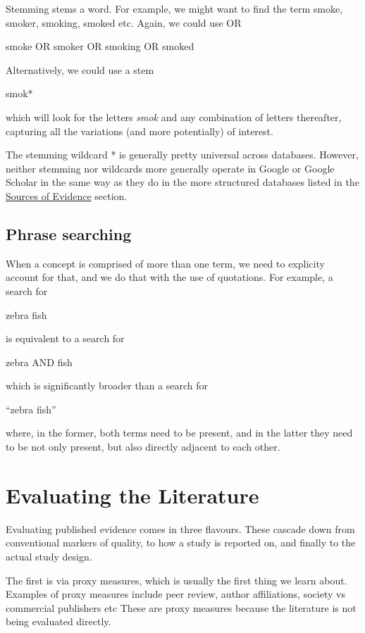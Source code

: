 \documentclass[
]{book}
\begin{document}
Stemming stems a word. For example, we might want to find the term smoke, smoker, smoking, smoked etc. Again, we could use OR

smoke OR smoker OR smoking OR smoked

Alternatively, we could use a stem

smok*

which will look for the letters \emph{smok} and any combination of letters thereafter, capturing all the variations (and more potentially) of interest.

The stemming wildcard * is generally pretty universal across databases. However, neither stemming nor wildcards more generally operate in Google or Google Scholar in the same way as they do in the more structured databases listed in the \href{}{Sources of Evidence} section.

\subsection{Phrase searching}\label{phrase-searching}

When a concept is comprised of more than one term, we need to explicity account for that, and we do that with the use of quotations. For example, a search for

zebra fish

is equivalent to a search for

zebra AND fish

which is significantly broader than a search for

``zebra fish''

where, in the former, both terms need to be present, and in the latter they need to be not only present, but also directly adjacent to each other.

\section{Evaluating the Literature}\label{evaluating-the-literature}

Evaluating published evidence comes in three flavours. These cascade down from conventional markers of quality, to how a study is reported on, and finally to the actual study design.

The first is via proxy measures, which is usually the first thing we learn about. Examples of proxy measures include peer review, author affiliations, society vs commercial publishers etc These are proxy measures because the literature is not being evaluated directly.
\end{document}
